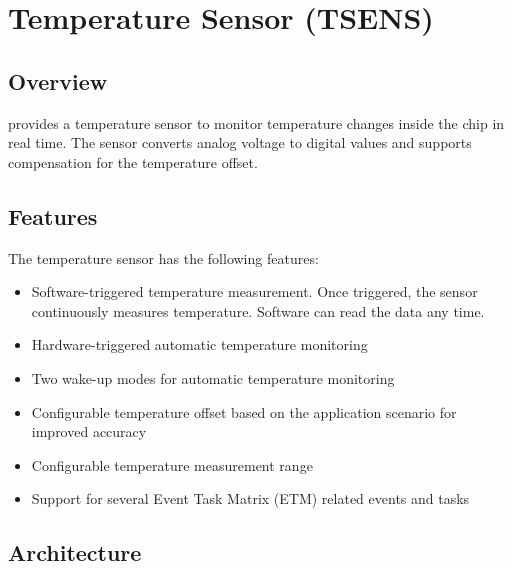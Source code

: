 \documentclass[main\_\_EN.tex]{subfiles}
\begin{document}

\ifglobal
\else
    {\let\clearpage\relax \listoftodos}
    {\let\clearpage\relax \listofdonetodos}
    \tableofcontents
\fi



\hypertarget{tmpsen}{}
\chapter{Temperature Sensor (TSENS)}
\label{mod:tmpsen}

\section{Overview}

\chipname{} provides a temperature sensor to monitor temperature changes inside the chip in real time. The sensor converts analog voltage to digital values and supports compensation for the temperature offset.

\section{Features}

The temperature sensor has the following features:

\begin{itemize}
    \item Software-triggered temperature measurement. Once triggered, the sensor continuously measures temperature. Software can read the data any time.
    \item Hardware-triggered automatic temperature monitoring
    \item Two wake-up modes for automatic temperature monitoring
    \item Configurable temperature offset based on the application scenario for improved accuracy
    \item Configurable temperature measurement range
\item Support for several Event Task Matrix (ETM) related events and tasks
\end{itemize}

\section{Architecture}
\end{document}
